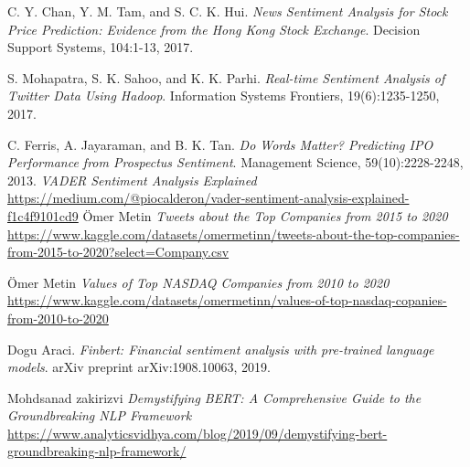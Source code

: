 \documentclass[12pt, a4paper,twoside]{report}
\theoremstyle{plain} %
\theoremstyle{definition} %
\theoremstyle{remark} %
\numberwithin{equation}{chapter}
\begin{document}
\begin{thebibliography}{999}
C. Y. Chan, Y. M. Tam, and S. C. K. Hui.
\textit{News Sentiment Analysis for Stock Price Prediction: Evidence from the Hong Kong Stock Exchange}.
Decision Support Systems, 104:1-13, 2017.

S. Mohapatra, S. K. Sahoo, and K. K. Parhi.
\textit{Real-time Sentiment Analysis of Twitter Data Using Hadoop}.
Information Systems Frontiers, 19(6):1235-1250, 2017.

C. Ferris, A. Jayaraman, and B. K. Tan.
\textit{Do Words Matter? Predicting IPO Performance from Prospectus Sentiment}.
Management Science, 59(10):2228-2248, 2013.
\textit{VADER Sentiment Analysis Explained}
\url{https://medium.com/@piocalderon/vader-sentiment-analysis-explained-f1c4f9101cd9}
\"Omer Metin
\textit{Tweets about the Top Companies from 2015 to 2020}
\url{https://www.kaggle.com/datasets/omermetinn/tweets-about-the-top-companies-from-2015-to-2020?select=Company.csv}

\"Omer Metin
\textit{Values of Top NASDAQ Companies from 2010 to 2020}
\url{https://www.kaggle.com/datasets/omermetinn/values-of-top-nasdaq-copanies-from-2010-to-2020}

Dogu Araci.
\textit{Finbert: Financial sentiment analysis with pre-trained language models}.
arXiv preprint arXiv:1908.10063, 2019.

Mohdsanad zakirizvi
\textit{Demystifying BERT: A Comprehensive Guide to the Groundbreaking NLP Framework}
\url{https://www.analyticsvidhya.com/blog/2019/09/demystifying-bert-groundbreaking-nlp-framework/}
\end{thebibliography}
\end{document}
